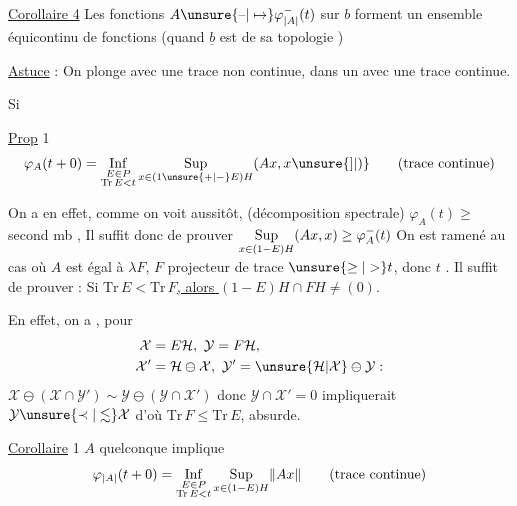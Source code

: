 \uline{Corollaire 4} Les fonctions $A\unsure{\text{--}|\mapsto}\varphi^-_{\lvert A\rvert}(t)$ sur $b$ forment un ensemble équicontinu de fonctions (quand $\underline b$ est  de sa topologie )


\uline{Astuce} : On plonge   avec une trace non continue, dans un  avec une trace continue.

Si 

\uline{Prop} 1
\[
\varphi_A(t+0)=\mathop{\rm Inf}\limits_{\substack{E\in P\\\mathrm{Tr}\,E<t}}
\mathop{\rm Sup}\limits_{x\in(1\unsure{+|-}E)H}(Ax,x\unsure{]|)}
\qquad\text{(trace continue)}
\]

 On a en effet, comme on voit aussitôt, (décomposition spectrale) $\varphi_A(t)\geq$ second mb , Il suffit donc de prouver $\mathop{\rm Sup}\limits_{x\in(1-E)H}(Ax,x)\geq\varphi^-_A(t)$  On est ramené au cas où $A$ est égal à $\lambda F$, $F$ projecteur de trace $\unsure{\geq|>}t$, donc  $t$  \unsure{$=$}.   Il suffit de prouver : Si \uline{$\mathrm{Tr}\,E<\mathrm{Tr}\,F$, alors $(1-E)H\cap FH\neq(0)$}.

En effet, on a , pour
\[
\begin{aligned}
\mathcal X&=E\mathcal H,\ \mathcal Y=F\mathcal H,\\
\mathcal X'&=\mathcal H\ominus\mathcal X,\ \mathcal Y'=\unsure{\mathcal H|\mathcal X}\ominus\mathcal Y :
\end{aligned}
\]
$\mathcal X\ominus(\mathcal X\cap\mathcal Y')\sim\mathcal Y\ominus(\mathcal Y\cap\mathcal X')$ donc $\mathcal Y\cap\mathcal X'=0$ impliquerait  $\mathcal Y\unsure{\prec|\lesssim}\mathcal X$ d'où $\mathrm{Tr}\,F\leq\mathrm{Tr}\,E$, absurde.

\uline{Corollaire} 1 $A$ quelconque implique
\[
\varphi_{\lvert A\rvert}(t+0)=\mathop{\rm Inf}\limits_{\substack{E\in P\\\mathrm{Tr}\,E<t}}
\mathop{\rm Sup}\limits_{x\in(1-E)H}\lVert Ax\rVert\qquad\text{(trace continue)}
\]

